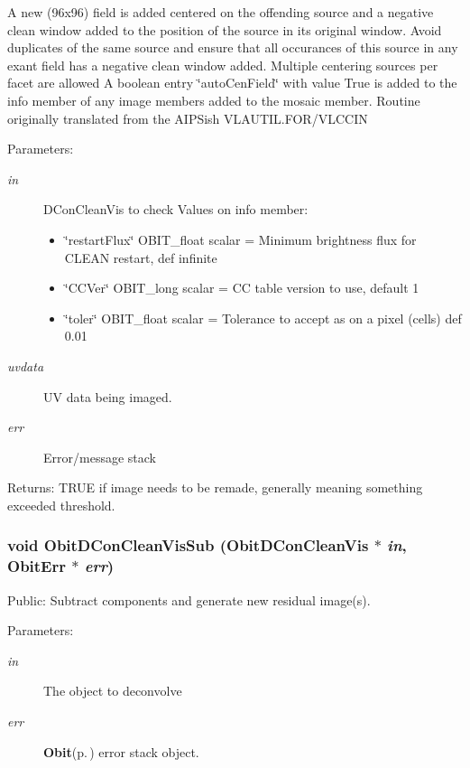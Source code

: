 A new (96x96) field is added centered on the offending source and a negative clean window added to the position of the source in its original window. Avoid duplicates of the same source and ensure that all occurances of this source in any exant field has a negative clean window added. Multiple centering sources per facet are allowed A boolean entry \char`\"{}auto\-Cen\-Field\char`\"{} with value True is added to the info member of any image members added to the mosaic member. Routine originally translated from the AIPSish VLAUTIL.FOR/VLCCIN \begin{Desc}
\item[Parameters:]
\begin{description}
\item[{\em in}]DCon\-Clean\-Vis to check Values on info member: \begin{itemize}
\item \char`\"{}restart\-Flux\char`\"{} OBIT\_\-float scalar = Minimum brightness flux for CLEAN restart, def infinite \item \char`\"{}CCVer\char`\"{} OBIT\_\-long scalar = CC table version to use, default 1 \item \char`\"{}toler\char`\"{} OBIT\_\-float scalar = Tolerance to accept as on a pixel (cells) def 0.01 \end{itemize}
\item[{\em uvdata}]UV data being imaged. \item[{\em err}]Error/message stack \end{description}
\end{Desc}
\begin{Desc}
\item[Returns:]TRUE if image needs to be remade, generally meaning something exceeded threshold. \end{Desc}
\subsubsection{\setlength{\rightskip}{0pt plus 5cm}void Obit\-DCon\-Clean\-Vis\-Sub ({\bf Obit\-DCon\-Clean\-Vis} $\ast$ {\em in}, {\bf Obit\-Err} $\ast$ {\em err})}\label{ObitDConCleanVis_8h_a19}


Public: Subtract components and generate new residual image(s). 

\begin{Desc}
\item[Parameters:]
\begin{description}
\item[{\em in}]The object to deconvolve \item[{\em err}]{\bf Obit}{\rm (p.\,\pageref{structObit})} error stack object. \end{description}
\end{Desc}
